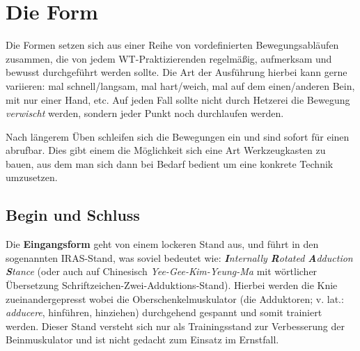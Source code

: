 

\newenvironment{WTSatz}[1]
	{\WTGaleryResetSlideshowCounter \subsection{#1}}
	{}

\newenvironment{WTSatzTeil}[2]
	{\paragraph{#1} (\textit{#2})}
	{}

\def\WTXFormen_EingangsGraphics#1{\texttt{[image: resources/images/eingangsform/\#1]}}


\renewcommand\chapterillustration{pushing_minimalistisch}
\chapter{Die Form}

Die Formen setzen sich aus einer Reihe von vordefinierten Bewegungsabl\"aufen zusammen, die von jedem WT-Praktizierenden regelm\"a{\ss}ig, aufmerksam und bewusst durchgef\"uhrt werden sollte. Die Art der Ausf\"uhrung hierbei kann gerne variieren: mal schnell/langsam, mal hart/weich, mal auf dem einen/anderen Bein, mit nur einer Hand, etc. Auf jeden Fall sollte nicht durch Hetzerei die Bewegung \textit{verwischt} werden, sondern jeder Punkt noch durchlaufen werden.

Nach l\"angerem \"Uben schleifen sich die Bewegungen ein und sind sofort f\"ur einen abrufbar. Dies gibt einem die M\"oglichkeit sich eine Art Werkzeugkasten zu bauen, aus dem man sich dann bei Bedarf bedient um eine konkrete Technik umzusetzen.

\newpage


\section{Begin und Schluss}





Die \textbf{Eingangsform} geht von einem lockeren Stand aus, und f\"uhrt in den sogenannten IRAS-Stand, was soviel bedeutet wie: \textit{\textbf{I}nternally \textbf{R}otated \textbf{A}dduction \textbf{S}tance} (oder auch auf Chinesisch \textit{Yee-Gee-Kim-Yeung-Ma} mit w\"ortlicher \"Ubersetzung Schriftzeichen-Zwei-Adduktions-Stand). Hierbei werden die Knie zueinandergepresst wobei die Oberschenkelmuskulator (die Adduktoren; v. lat.: \textit{adducere}, hinf\"uhren, hinziehen) durchgehend gespannt und somit trainiert werden. Dieser Stand versteht sich nur als Trainingsstand zur Verbesserung der Beinmuskulator und ist nicht gedacht zum Einsatz im Ernstfall.

